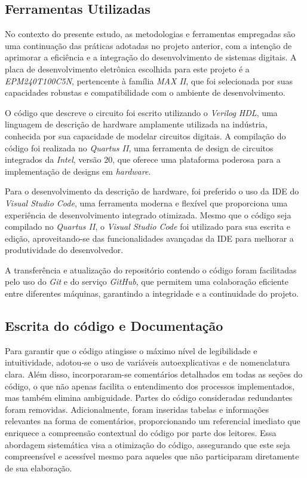 \documentclass[
	article,			%
	11pt,				%
	oneside,			%
	a4paper,			%
	english,			%
	brazil,				%
	sumario=tradicional
	]{abntex2}
\begin{document}
\subsection{Ferramentas Utilizadas}

No contexto do presente estudo, as metodologias e ferramentas empregadas são uma continuação das práticas adotadas no projeto anterior, com a intenção de aprimorar a eficiência e a integração do desenvolvimento de sistemas digitais. A placa de desenvolvimento eletrônica escolhida para este projeto é a \textit{EPM240T100C5N}, pertencente à família \textit{MAX II}, que foi selecionada por suas capacidades robustas e compatibilidade com o ambiente de desenvolvimento.

O código que descreve o circuito foi escrito utilizando o \textit{Verilog HDL}, uma linguagem de descrição de hardware amplamente utilizada na indústria, conhecida por sua capacidade de modelar circuitos digitais. A compilação do código foi realizada no \textit{Quartus II}, uma ferramenta de design de circuitos integrados da \textit{Intel}, versão 20, que oferece uma plataforma poderosa para a implementação de designs em \textit{hardware}.

Para o desenvolvimento da descrição de hardware, foi preferido o uso da IDE do \textit{Visual Studio Code}, uma ferramenta moderna e flexível que proporciona uma experiência de desenvolvimento integrado otimizada. Mesmo que o código seja compilado no \textit{Quartus II}, o \textit{Visual Studio Code} foi utilizado para sua escrita e edição, aproveitando-se das funcionalidades avançadas da IDE para melhorar a produtividade do desenvolvedor.

A transferência e atualização do repositório contendo o código foram facilitadas pelo uso do \textit{Git} e do serviço \textit{GitHub}, que permitem uma colaboração eficiente entre diferentes máquinas, garantindo a integridade e a continuidade do projeto.

\subsection{Escrita do código e Documentação}

Para garantir que o código atingisse o máximo nível de legibilidade e intuitividade, adotou-se o uso de variáveis autoexplicativas e de nomenclatura clara. Além disso, incorporaram-se comentários detalhados em todas as seções do código, o que não apenas facilita o entendimento dos processos implementados, mas também elimina ambiguidade. Partes do código consideradas redundantes foram removidas. Adicionalmente, foram inseridas tabelas e informações relevantes na forma de comentários, proporcionando um referencial imediato que enriquece a compreensão contextual do código por parte dos leitores. Essa abordagem sistemática visa a otimização do código, assegurando que este seja compreensível e acessível mesmo para aqueles que não participaram diretamente de sua elaboração.
\end{document}
